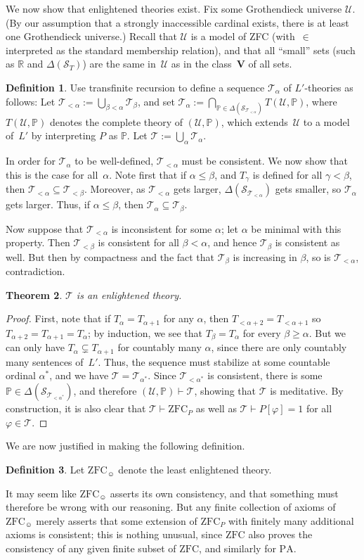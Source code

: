 \documentclass[12pt]{article}
\newcommand{\PP}{\mathbb{P}}
\newcommand{\vp}{\varphi}
\newcommand{\RR}{\mathbb{R}}
\newcommand{\zfc}{\mathrm{ZFC}}
\newcommand{\zfcp}{{\zfc_P}}
\newcommand{\zfch}{{\zfc_{\smiley}}}
\newcommand{\pa}{\mathrm{PA}}
\newcommand{\cL}{L'}
\newcommand{\cS}{\mathcal{S}}
\newcommand{\cT}{\mathcal{T}}
\newcommand{\cU}{\mathcal{U}}
\theoremstyle{plain}
\newtheorem{theorem}{Theorem}[subsection]
\theoremstyle{definition}
\newtheorem{definition}[theorem]{Definition}
\theoremstyle{remark}
\begin{document}
We now show that enlightened theories exist.
Fix some Grothendieck universe $\cU$. (By our assumption that a strongly inaccessible cardinal exists, there is at least one Grothendieck universe.) Recall that $\cU$ is a model of ZFC (with~$\in$ interpreted as the standard membership relation), and that all ``small'' sets (such as $\RR$ and $\Delta(\cS_T)$) are the same in~$\cU$ as in the class~$\mathbf{V}$ of all sets.
\begin{definition}
Use transfinite recursion to define a sequence $\cT_\alpha$ of $\cL$-theories as follows: Let $\cT_{<\alpha} := \bigcup_{\beta<\alpha} \cT_\beta$, and set $\cT_\alpha := \bigcap_{\PP\in\Delta(\cS_{\cT_{<\alpha}})} T(\cU,\PP)$, where $T(\cU,\PP)$ denotes the complete theory of $(\cU,\PP)$, which extends~$\cU$ to a model of~$\cL$ by interpreting $P$ as $\PP$.
Let $\cT := \bigcup_\alpha \cT_\alpha$.
\end{definition}
In order for $\cT_\alpha$ to be well-defined, $\cT_{<\alpha}$ must be consistent. We now show that this is the case for all~$\alpha$.
Note first that if $\alpha\le\beta$, and $T_\gamma$ is defined for all $\gamma<\beta$, then $\cT_{<\alpha}\subseteq\cT_{<\beta}$. Moreover, as $\cT_{<\alpha}$ gets larger, $\Delta(\cS_{\cT_{<\alpha}})$ gets smaller, so $\cT_\alpha$ gets larger. Thus, if $\alpha\le\beta$, then $\cT_\alpha\subseteq\cT_\beta$.

Now suppose that $\cT_{<\alpha}$ is inconsistent for some $\alpha$; let $\alpha$ be minimal with this property. Then $\cT_{<\beta}$ is consistent for all $\beta<\alpha$, and hence $\cT_\beta$ is consistent as well. But then by compactness and the fact that $\cT_\beta$ is increasing in $\beta$, so is $\cT_{<\alpha}$, contradiction.
\begin{theorem}
$\cT$ is an enlightened theory.
\end{theorem}
\begin{proof}
First, note that if $T_{\alpha}= T_{\alpha+1}$ for any $\alpha$, then $T_{<\alpha+2} = T_{<\alpha+1}$ so $T_{\alpha+2} = T_{\alpha+1} = T_\alpha$; by induction, we see that $T_\beta = T_\alpha$ for every $\beta\ge\alpha$. But we can only have $T_{\alpha}\subsetneq T_{\alpha+1}$ for countably many $\alpha$, since there are only countably many sentences of~$\cL$. Thus, the sequence must stabilize at some countable ordinal $\alpha^*$, and we have $\cT = \cT_{\alpha^*}$. Since $\cT_{<\alpha^*}$ is consistent, there is some $\PP\in\Delta(\cS_{\cT_{<\alpha^*}})$, and therefore $(\cU,\PP)\vdash\cT$, showing that $\cT$ is meditative. By construction, it is also clear that $\cT\vdash\zfcp$ as well as $\cT\vdash P[\vp]=1$ for all $\vp\in\cT$.
\end{proof}
We are now justified in making the following definition.
\begin{definition}
Let $\zfch$ denote the least enlightened theory.
\end{definition}
It may seem like $\zfch$ asserts its own consistency, and that something must therefore be wrong with our reasoning. But any finite collection of axioms of $\zfch$ merely asserts that some extension of $\zfcp$ with finitely many additional axioms is consistent; this is nothing unusual, since $\zfc$ also proves the consistency of any given finite subset of $\zfc$, and similarly for $\pa$.
\end{document}
